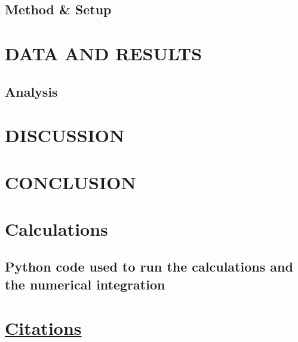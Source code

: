 \documentclass[%
 aapm,
 mph,%
 amsmath,amssymb,
 reprint,%
]{revtex4-2}
\begin{document}
\subsection{\label{sec_level1}Method \& Setup}




\newpage
\section{DATA AND RESULTS}


\subsection{Analysis}


\newpage
\section{DISCUSSION}


\section{CONCLUSION}


{
\appendix
\section{Calculations}
\subsection{\label{app:python}Python code used to run the calculations and the numerical integration}


}


\nocite{*}
\section*{\underline{Citations}}
\end{document}
